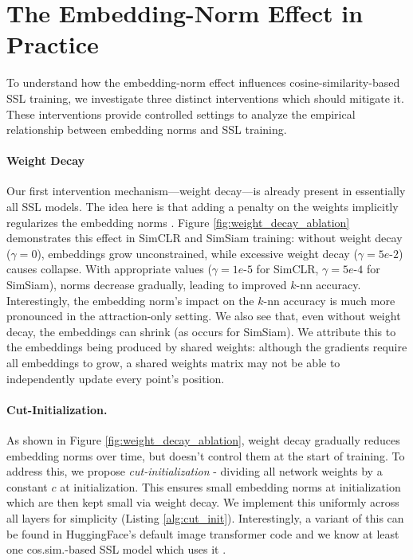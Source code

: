 \section{The Embedding-Norm Effect in Practice}
\label{sec:convergence}

To understand how the embedding-norm effect influences cosine-similarity-based SSL training, we investigate three distinct interventions which should mitigate it. These interventions provide controlled settings to analyze the empirical relationship between embedding norms and SSL training.

\paragraph{Weight Decay}

Our first intervention mechanism---weight decay---is already present in essentially all SSL models. The idea here is that adding a penalty on the weights implicitly regularizes the embedding norms \citep{normface}.
Figure \ref{fig:weight_decay_ablation} demonstrates this effect in SimCLR and SimSiam training: without weight decay ($\gamma=0$), embeddings grow unconstrained, while excessive weight decay ($\gamma=5e\text{-}2$) causes collapse. With appropriate values ($\gamma=1e\text{-}5$ for SimCLR, $\gamma=5e\text{-}4$ for SimSiam), norms decrease gradually, leading to improved $k$-nn accuracy. Interestingly, the embedding norm's impact on the $k$-nn accuracy is much more pronounced in the attraction-only setting. We also see that, even without weight decay, the embeddings can shrink (as occurs for SimSiam). We attribute this to the embeddings being produced by shared weights: although the gradients require all embeddings to grow, a shared weights matrix may not be able to independently update every point's position.



\paragraph{Cut-Initialization.}

As shown in Figure \ref{fig:weight_decay_ablation}, weight decay gradually reduces embedding norms over time, but doesn't control them at the start of training. To address this, we propose \emph{cut-initialization} - dividing all network weights by a constant $c$ at initialization. This ensures small embedding norms at initialization which are then kept small via weight decay. We implement this uniformly across all layers for simplicity (Listing \ref{alg:cut_init}). Interestingly, a variant of this can be found in HuggingFace's default image transformer code \cite{pytorch} and we know at least one cos.sim.-based SSL model which uses it \citep{beitv2}.


